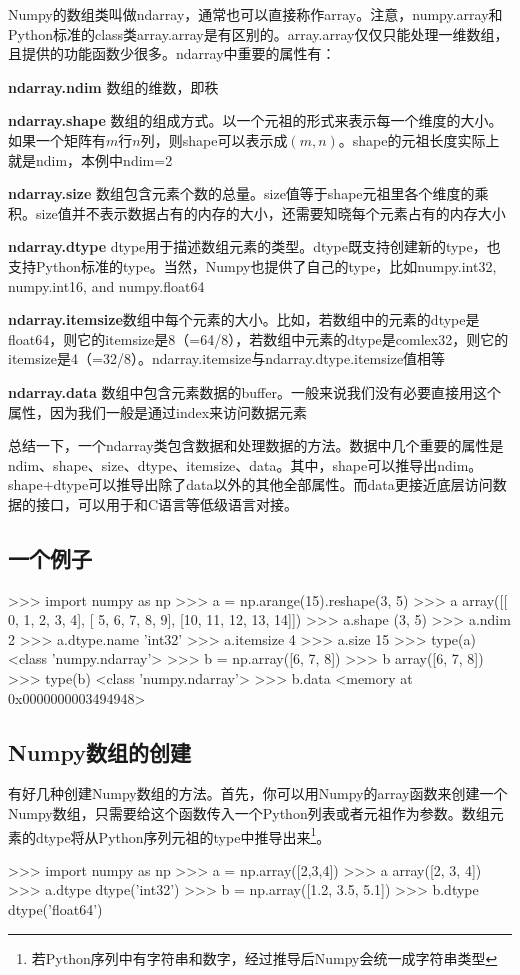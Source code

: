 Numpy的数组类叫做ndarray，通常也可以直接称作array。注意，numpy.array和Python标准的class类array.array是有区别的。array.array仅仅只能处理一维数组，且提供的功能函数少很多。ndarray中重要的属性有：
\begin{compactitem}
	\item \textbf{ndarray.ndim} 数组的维数，即秩
	\item \textbf{ndarray.shape} 数组的组成方式。以一个元祖的形式来表示每一个维度的大小。如果一个矩阵有$m$行$n$列，则shape可以表示成$(m,n)$。shape的元祖长度实际上就是ndim，本例中ndim=2
	\item \textbf{ndarray.size} 数组包含元素个数的总量。size值等于shape元祖里各个维度的乘积。size值并不表示数据占有的内存的大小，还需要知晓每个元素占有的内存大小
	\item \textbf{ndarray.dtype} dtype用于描述数组元素的类型。dtype既支持创建新的type，也支持Python标准的type。当然，Numpy也提供了自己的type，比如numpy.int32, numpy.int16, and numpy.float64
	\item \textbf{ndarray.itemsize}数组中每个元素的大小。比如，若数组中的元素的dtype是float64，则它的itemsize是8（=64/8），若数组中元素的dtype是comlex32，则它的itemsize是4（=32/8）。ndarray.itemsize与ndarray.dtype.itemsize值相等
	\item \textbf{ndarray.data} 数组中包含元素数据的buffer。一般来说我们没有必要直接用这个属性，因为我们一般是通过index来访问数据元素
\end{compactitem}

总结一下，一个ndarray类包含数据和处理数据的方法。数据中几个重要的属性是ndim、shape、size、dtype、itemsize、data。其中，shape可以推导出ndim。shape+dtype可以推导出除了data以外的其他全部属性。而data更接近底层访问数据的接口，可以用于和C语言等低级语言对接。
\subsection{一个例子}
\begin{python}
>>> import numpy as np
>>> a = np.arange(15).reshape(3, 5)
>>> a
array([[ 0,  1,  2,  3,  4],
       [ 5,  6,  7,  8,  9],
       [10, 11, 12, 13, 14]])
>>> a.shape
(3, 5)
>>> a.ndim
2
>>> a.dtype.name
'int32'
>>> a.itemsize
4
>>> a.size
15
>>> type(a)
<class 'numpy.ndarray'>
>>> b = np.array([6, 7, 8])
>>> b
array([6, 7, 8])
>>> type(b)
<class 'numpy.ndarray'>
>>> b.data
<memory at 0x0000000003494948>
\end{python}
\subsection{Numpy数组的创建}
有好几种创建Numpy数组的方法。首先，你可以用Numpy的array函数来创建一个Numpy数组，只需要给这个函数传入一个Python列表或者元祖作为参数。数组元素的dtype将从Python序列元祖的type中推导出来\footnote{若Python序列中有字符串和数字，经过推导后Numpy会统一成字符串类型}。
\begin{python}
>>> import numpy as np
>>> a = np.array([2,3,4])
>>> a
array([2, 3, 4])
>>> a.dtype
dtype('int32')
>>> b = np.array([1.2, 3.5, 5.1])
>>> b.dtype
dtype('float64')
\end{python}


